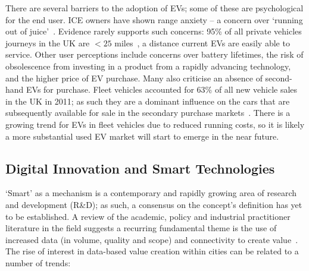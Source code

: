 \documentclass[b5paper,10pt]{article}
\begin{document}
There are several barriers to the adoption of EVs; some of these are
psychological for the end user. ICE owners have shown range anxiety --
a concern over `running out of
juice'~\citep{oflev:2011,yilmaz+krein:2012}. Evidence rarely supports
such concerns: 95\% of all private vehicles journeys in the UK are
$<25$ miles~\citep{oflev:2011,brook:2015}, a distance current EVs are
easily able to service. Other user perceptions include concerns over
battery lifetimes, the risk of obsolescence from investing in a
product from a rapidly advancing technology, and the higher price of
EV purchase.  Many also criticise an absence of second-hand EVs for
purchase. Fleet vehicles accounted for 63\% of all new vehicle sales
in the UK in 2011; as such they are a dominant influence on the cars
that are subsequently available for sale in the secondary purchase
markets~\citep{fleets:2012}. There is a growing trend for EVs in fleet
vehicles due to reduced running costs, so it is likely a more
substantial used EV market will start to emerge in the near future.


\subsection{Digital Innovation and Smart Technologies}

`Smart' as a mechanism is a contemporary and rapidly growing area of
research and development (R\&D); as such, a consensus on the concept's
definition has yet to be established. A review of the academic, policy
and industrial practitioner literature in the field suggests a
recurring fundamental theme is the use of increased data (in volume,
quality and scope) and connectivity to create
value~\citep{komninos:2002,arup-et-al:2011,harrison+abbottdonnelly:2011,batty-et-al:2012,buscher:2014}. The
rise of interest in data-based value creation within cities can be
related to a number of trends:
\end{document}
